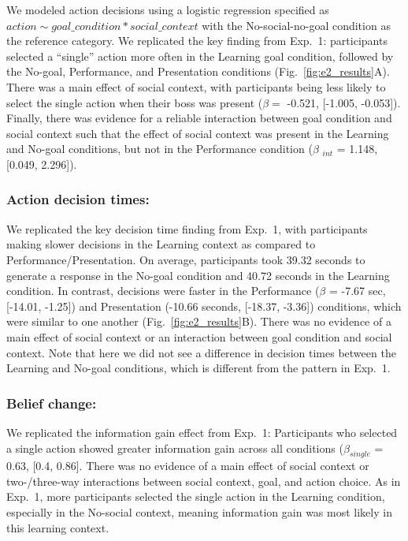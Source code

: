 \documentclass[10pt, letterpaper]{article}
\begin{document}
We modeled action decisions using a logistic regression specified as
\texttt{$action \sim goal\_condition * social\_context$} with the
No-social-no-goal condition as the reference category. We replicated the
key finding from Exp.~1: participants selected a ``single'' action more
often in the Learning goal condition, followed by the No-goal,
Performance, and Presentation conditions (Fig.~\ref{fig:e2_results}A).
There was a main effect of social context, with participants being less
likely to select the single action when their boss was present
(\(\beta =\) -0.521, {[}-1.005, -0.053{]}). Finally, there was evidence
for a reliable interaction between goal condition and social context
such that the effect of social context was present in the Learning and
No-goal conditions, but not in the Performance condition (\(\beta\)
\(_{int}\) = 1.148, {[}0.049, 2.296{]}).

\subsubsection{Action decision times:}\label{action-decision-times-1}

We replicated the key decision time finding from Exp.~1, with
participants making slower decisions in the Learning context as compared
to Performance/Presentation. On average, participants took 39.32 seconds
to generate a response in the No-goal condition and 40.72 seconds in the
Learning condition. In contrast, decisions were faster in the
Performance (\(\beta\) = -7.67 sec, {[}-14.01, -1.25{]}) and
Presentation (-10.66 seconds, {[}-18.37, -3.36{]}) conditions, which
were similar to one another (Fig.~\ref{fig:e2_results}B). There was no
evidence of a main effect of social context or an interaction between
goal condition and social context. Note that here we did not see a
difference in decision times between the Learning and No-goal
conditions, which is different from the pattern in Exp.~1.

\subsubsection{Belief change:}\label{belief-change-1}

We replicated the information gain effect from Exp.~1: Participants who
selected a single action showed greater information gain across all
conditions (\(\beta_{single}\) = 0.63, {[}0.4, 0.86{]}. There was no
evidence of a main effect of social context or two-/three-way
interactions between social context, goal, and action choice. As in
Exp.~1, more participants selected the single action in the Learning
condition, especially in the No-social context, meaning information gain
was most likely in this learning context.
\end{document}
